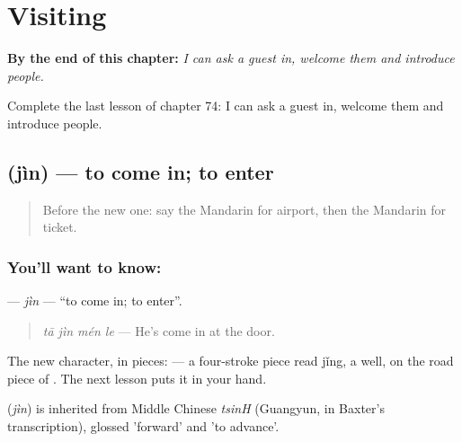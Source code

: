 
\chapter{Visiting}
\label{ch:zh-visiting}

\begin{chapteropening}
\textbf{By the end of this chapter:} \emph{I can ask a guest in, welcome them and introduce people.}

Complete the last lesson of chapter 74: I can ask a guest in, welcome them and introduce people.
\end{chapteropening}

\section[\texorpdfstring{\zh{进} (jìn)}{进 (jìn)}]{ (jìn) — to come in; to enter}

\label{lesson:ZH-C74-jin}



\begin{quote}
Before the new one: say the Mandarin for airport, then the Mandarin for ticket.
\end{quote}

\subsection*{You'll want to know: }
\textbf{} — \emph{jìn} — \textquotedblleft{}to come in; to enter\textquotedblright{}.

\begin{quote}
\textbf{} \emph{tā jìn mén le} — He's come in at the door.
\end{quote}

The new character, in pieces:  — a four-stroke piece read jǐng, a well, on the road piece of . The next lesson puts it in your hand.

\begin{cousinweb}
\textbf{} (\emph{jìn}) is inherited from Middle Chinese \emph{tsinH} (Guangyun, in Baxter's transcription), glossed 'forward' and 'to advance'.
\end{cousinweb}

